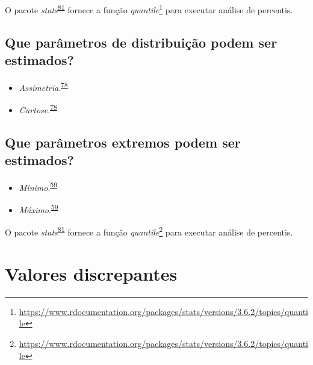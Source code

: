\documentclass[
  a4paper,
]{book}
\renewcommand{\href}[2]{#2\footnote{\url{#1}}}
\newenvironment{infobox}[1]
  {
  \begin{itemize}
  \renewcommand{\labelitemi}{
    \raisebox{-.7\height}[0pt][0pt]{
      {\setkeys{Gin}{width=3em,keepaspectratio}
        \texttt{[image: \#1]}}
    }
  }
  \setlength{\fboxsep}{1em}
  \begin{blackbox}
  \item
  }
  {
  \end{blackbox}
  \end{itemize}
  }
\begin{document}
\begin{infobox}{images/Rlogo}
O pacote \emph{stats}\textsuperscript{\protect\hyperlink{ref-base}{81}} fornece a função \href{https://www.rdocumentation.org/packages/stats/versions/3.6.2/topics/quantile}{\emph{quantile}} para executar análise de percentis.

\end{infobox}

\hypertarget{que-paruxe2metros-de-distribuiuxe7uxe3o-podem-ser-estimados}{%
\subsection{Que parâmetros de distribuição podem ser estimados?}\label{que-paruxe2metros-de-distribuiuxe7uxe3o-podem-ser-estimados}}

\begin{itemize}
\item
  \emph{Assimetria}.\textsuperscript{\protect\hyperlink{ref-kanji2006}{78}}
\item
  \emph{Curtose}.\textsuperscript{\protect\hyperlink{ref-kanji2006}{78}}
\end{itemize}

\hypertarget{que-paruxe2metros-extremos-podem-ser-estimados}{%
\subsection{Que parâmetros extremos podem ser estimados?}\label{que-paruxe2metros-extremos-podem-ser-estimados}}

\begin{itemize}
\item
  \emph{Mínimo}.\textsuperscript{\protect\hyperlink{ref-Ali2016}{59}}
\item
  \emph{Máximo}.\textsuperscript{\protect\hyperlink{ref-Ali2016}{59}}
\end{itemize}

\begin{infobox}{images/Rlogo}
O pacote \emph{stats}\textsuperscript{\protect\hyperlink{ref-base}{81}} fornece a função \href{https://www.rdocumentation.org/packages/stats/versions/3.6.2/topics/quantile}{\emph{quantile}} para executar análise de percentis.

\end{infobox}

\hypertarget{outliers}{%
\section{Valores discrepantes}\label{outliers}}
\end{document}
